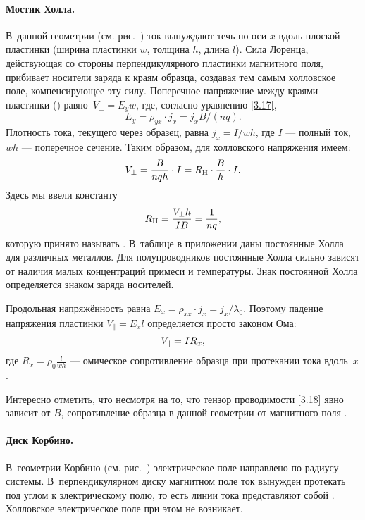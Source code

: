 \paragraph{Мостик Холла.}
В~данной геометрии (см. рис.~) ток вынуждают течь по
оси $x$ вдоль плоской пластинки (ширина пластинки $w$, толщина $h$,
длина $l$).
Сила Лоренца, действующая со стороны перпендикулярного
пластинки магнитного поля, прибивает носители заряда к краям образца,
создавая тем самым холловское поле, компенсирующее эту силу.
Поперечное напряжение между краями пластинки
() равно~$V_{\perp}=E_yw$,
где, согласно уравнению \eqref{3.17},
\[
E_y=\rho_{yx}\cdot j_x=j_x B/(nq).
\]
Плотность тока, текущего через образец, равна $j_x=I/wh$, где $I$ ---
полный ток, $wh$ --- поперечное сечение.
Таким образом, для холловского напряжения имеем:
\begin{equation}
    V_{\perp}=\frac{B}{nqh}\cdot I =R_{\rm H}\cdot \frac{B}{h}\cdot I .
    \eqmark{3.19}
\end{equation}
Здесь мы ввели константу
\begin{equation}
    R_{\rm H}= \frac{V_{\perp}h}{IB} = \frac{1}{nq},
    \eqmark{HallConstant}
\end{equation}
которую принято называть . В~таблице в приложении даны
постоянные Холла для различных металлов. Для полупроводников постоянные Холла
сильно зависят от наличия малых концентраций примеси и температуры.
Знак постоянной Холла определяется знаком заряда носителей.

Продольная напряжённость равна $E_x = \rho_{xx}\cdot j_x = j_x/\lambda_0$.
Поэтому падение напряжения  пластинки $V_{\parallel}=E_x l$
определяется просто законом Ома:
\begin{equation}
    V_{\parallel}= I R_x,
    \eqmark{3.20}
\end{equation}
где $R_x = \rho_0 \frac{l}{wh}$ --- омическое сопротивление
образца при протекании тока вдоль~$x$.

Интересно отметить, что несмотря на то, что тензор проводимости \eqref{3.18}
явно зависит от $B$, сопротивление образца в данной геометрии от магнитного поля
.

\paragraph{Диск Корбино.}
В~геометрии Корбино (см. рис.~) электрическое поле
направлено по радиусу системы. В~перпендикулярном диску магнитном поле ток
вынужден протекать под углом к электрическому полю, то есть линии тока
представляют собой . Холловское электрическое
поле при этом не возникает.

